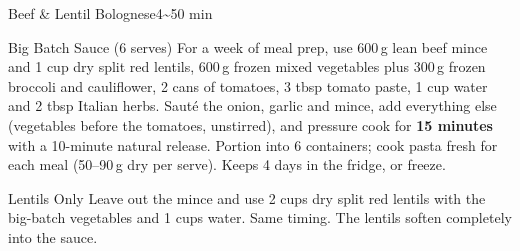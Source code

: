 \begin{recipebox}{Beef \& Lentil Bolognese}{4}{\textasciitilde50 min}
\begin{variationbox}{Big Batch Sauce (6 serves)}
For a week of meal prep, use 600\,g lean beef mince and 1 cup dry split red
lentils, 600\,g frozen mixed vegetables plus 300\,g frozen broccoli and
cauliflower, 2 cans of tomatoes, 3 tbsp tomato paste, 1 cup water and 2 tbsp
Italian herbs. Saut\'e the onion, garlic and mince, add everything else
(vegetables before the tomatoes, unstirred), and pressure cook for
\textbf{15 minutes} with a 10-minute natural release. Portion into 6 containers;
cook pasta fresh for each meal (50--90\,g dry per serve). Keeps 4 days in the
fridge, or freeze.
\end{variationbox}

\begin{variationbox}{Lentils Only}
Leave out the mince and use 2 cups dry split red lentils with
the big-batch vegetables and 1 cups water. Same timing. The
lentils soften completely into the sauce.
\end{variationbox}

\end{recipebox}
